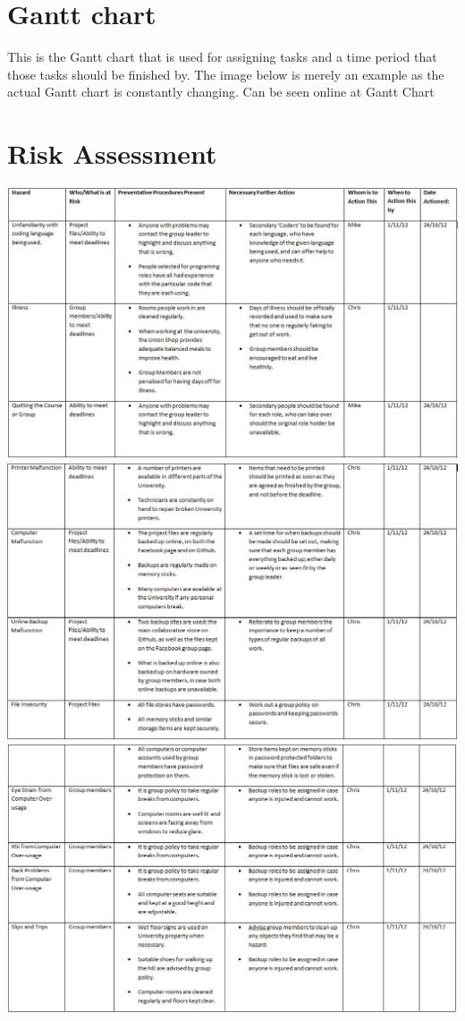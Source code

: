 \documentclass{project}
\begin{document}
\section{Gantt chart}
This is the Gantt chart that is used for assigning tasks and a time period that those
tasks should be finished by. The image below is merely an example as the actual
Gantt chart is constantly changing. Can be seen online at
Gantt Chart

\section{Risk Assessment}
\includegraphics[scale=0.6]{risk1.jpg}\\
\includegraphics[scale=0.6]{risk2.jpg}\\
\includegraphics[scale=0.6]{risk3.jpg}\\
\end{document}
